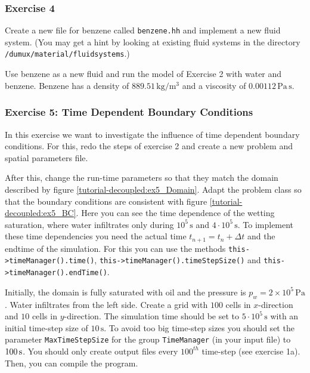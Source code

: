 \subsubsection{Exercise 4}
Create a new file for benzene called \texttt{benzene.hh} and implement
a new fluid system. (You may get a hint by looking at existing fluid
systems in the directory \verb+/dumux/material/fluidsystems+.)

Use benzene as a new fluid and run the model of Exercise 2 with water
and benzene. Benzene has a density of $889.51 \, \text{kg} / \text{m}^3$
and a viscosity of $0.00112 \, \text{Pa} \, \text{s}$.

\subsubsection{Exercise 5: Time Dependent Boundary Conditions}
In this exercise we want to investigate the influence of time dependent boundary
conditions. For this, redo the steps of exercise 2 and create a new problem and
spatial parameters file.

After this, change the run-time parameters so that they match the
domain described by figure \ref{tutorial-decoupled:ex5_Domain}. Adapt
the problem class so that the boundary conditions are consistent with
figure \ref{tutorial-decoupled:ex5_BC}. Here you can see the time dependence of
the wetting saturation, where water infiltrates only during $10^5\,\text{s}$ and
$4 \cdot 10^5\,\text{s}$. To implement these time dependencies you need the actual
time $t_{n+1}=t_n + \Delta t$ and the endtime of the simulation. For this you can
use the methods \texttt{this->timeManager().time()}, \texttt{this->timeManager().timeStepSize()}
and \texttt{this->timeManager().endTime()}.

Initially, the domain is fully saturated with oil and the pressure is $p_w = 2 \times
10^5\,\text{Pa}$.  Water infiltrates from the left side. Create a grid
with $100$ cells in $x$-direction and $10$ cells in $y$-direction. The
simulation time should be set to $5 \cdot 10^5\,\text{s}$ with an
initial time-step size of $10\,\text{s}$. To avoid too big time-step sizes you
should set the parameter \texttt{MaxTimeStepSize} for the group \texttt{TimeManager}
(in your input file) to $\unit[100]{s}$. You should only create output files
every $100^{th}$ time-step (see exercise 1a). Then, you can compile the program.

